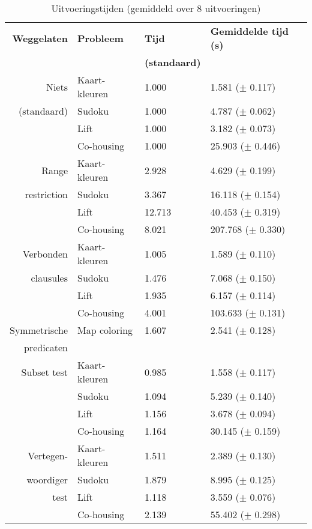 \begin{table}
  \caption{Uitvoeringstijden (gemiddeld over 8 uitvoeringen)}
  \begin{tabularx}{\linewidth}{rl|ll}

\textbf{Weggelaten}  & \textbf{Probleem}    & \textbf{Tijd}  & \textbf{Gemiddelde tijd (s)}\\
& & \textbf{(standaard)}\\
\toprule
Niets          & Kaart-kleuren  & 1.000       & 1.581   ($\pm$ 0.117)        \\
   (standaard)                   & Sudoku    & 1.000               & 4.787   ($\pm$ 0.062)    \\
                      & Lift    & 1.000             & 3.182   ($\pm$ 0.073)  \\
                      & Co-housing  & 1.000             & 25.903  ($\pm$ 0.446)  \\
\midrule
Range      & Kaart-kleuren  & 2.928           & 4.629   ($\pm$ 0.199)\\
      restriction                  & Sudoku    & 3.367             & 16.118  ($\pm$ 0.154)  \\
                        & Lift    & 12.713          & 40.453  ($\pm$ 0.319)\\
                        & Co-housing  & 8.021           & 207.768 ($\pm$ 0.330)\\
\midrule
Verbonden    & Kaart-kleuren  & 1.005           & 1.589   ($\pm$ 0.110)\\
    clausules       & Sudoku    & 1.476                          & 7.068   ($\pm$ 0.150)    \\
                        & Lift    & 1.935           & 6.157   ($\pm$ 0.114)\\
                        & Co-housing  & 4.001           & 103.633 ($\pm$ 0.131)\\
\midrule
Symmetrische  & Map coloring  & 1.607        & 2.541   ($\pm$ 0.128)\\
predicaten\\
\midrule
Subset test       & Kaart-kleuren  & 0.985               & 1.558   ($\pm$ 0.117)    \\
                        & Sudoku    & 1.094             & 5.239   ($\pm$ 0.140)  \\
                        & Lift    & 1.156           & 3.678   ($\pm$ 0.094)\\
                        & Co-housing  & 1.164           & 30.145  ($\pm$ 0.159)\\
\midrule
Vertegen-   & Kaart-kleuren  & 1.511        & 2.389   ($\pm$ 0.130)\\
             woordiger          & Sudoku    & 1.879               & 8.995   ($\pm$ 0.125)    \\
                test      & Lift    & 1.118             & 3.559   ($\pm$ 0.076)  \\
                      & Co-housing  & 2.139             & 55.402  ($\pm$ 0.298)  \\
  \end{tabularx}
  \label{tbl:uitvoering}
\end{table}

